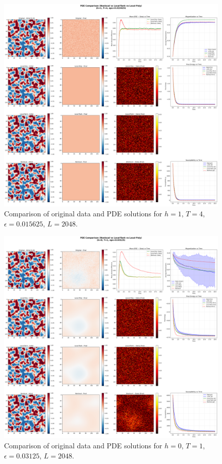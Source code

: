 \documentclass[11pt,a4paper]{article}
\begin{document}
\begin{figure}[!h]
    \centering
    \includegraphics[width=1.0\textwidth]{fig/compare_pde_solvers_L2048_h1_T4_eps0.015625.png}
    \caption{Comparison of original data and PDE solutions for $h=1$, $T=4$, $\epsilon=0.015625$, $L=2048$.}
    \label{fig:pde_comparison_h1_T4_eps0.015625_L2048}
\end{figure}


\begin{figure}[!h]
    \centering
    \includegraphics[width=1.0\textwidth]{fig/compare_pde_solvers_L2048_h0_T1_eps0.03125.png}
    \caption{Comparison of original data and PDE solutions for $h=0$, $T=1$, $\epsilon=0.03125$, $L=2048$.}
    \label{fig:pde_comparison_h0_T1_eps0.03125_L2048}
\end{figure}
\end{document}
